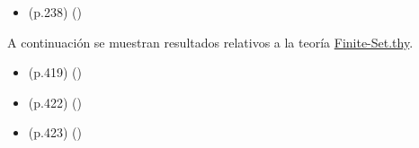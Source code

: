 \begin{isabellebody}
\begin{isamarkuptext}
\begin{itemize}
    \item (p.238) \isa{{\isasymUnion}\ {\isasymemptyset}\ {\isacharequal}\ {\isasymemptyset}} 
      \hfill ()
  \end{itemize}%
\end{isamarkuptext}\isamarkuptrue%
%
\isadelimdocument
%
\endisadelimdocument
%
\isatagdocument
%
\isamarkuptrue%
%
\endisatagdocument
{\isafolddocument}%
%
\isadelimdocument
%
\endisadelimdocument
%
\begin{isamarkuptext}%
A continuación se muestran resultados relativos a la teoría 
  \href{https://bit.ly/3bEIScG}{Finite-Set.thy}.%
\end{isamarkuptext}\isamarkuptrue%
%
\isadelimdocument
%
\endisadelimdocument
%
\isatagdocument
%
\isamarkuptrue%
%
\endisatagdocument
{\isafolddocument}%
%
\isadelimdocument
%
\endisadelimdocument
%
\begin{isamarkuptext}%
\begin{itemize}
    \item (p.419)  
      \hfill ()
  \end{itemize}%
\end{isamarkuptext}\isamarkuptrue%
%
\isadelimdocument
%
\endisadelimdocument
%
\isatagdocument
%
\isamarkuptrue%
%
\endisatagdocument
{\isafolddocument}%
%
\isadelimdocument
%
\endisadelimdocument
%
\begin{isamarkuptext}%
\begin{itemize}
    \item (p.422)  
      \hfill ()
    \item (p.423)  
      \hfill ()
  \end{itemize}%
\end{isamarkuptext}\isamarkuptrue%
%
\isadelimdocument
%
\endisadelimdocument
%
\isatagdocument
%
\isamarkuptrue%
%
\endisatagdocument
{\isafolddocument}%
%
\isadelimdocument
%
\endisadelimdocument
%
\begin{isamarkuptext}%

\end{isamarkuptext}
\end{isabellebody}
